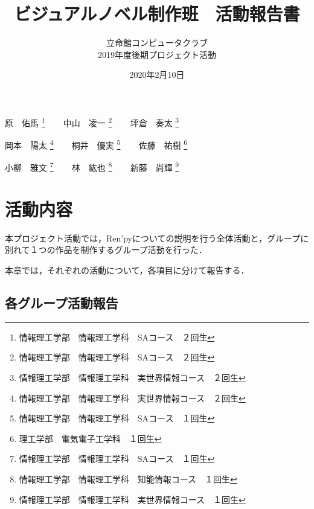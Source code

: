 \documentclass[a4paper]{jarticle}
\title{ビジュアルノベル制作班　活動報告書}
\author{立命館コンピュータクラブ\\2019年度後期プロジェクト活動}
\date{2020年2月10日}
\begin{document}
  \maketitle

  \begin{center}
    原　佑馬 \footnote{情報理工学部　情報理工学科　SAコース　２回生}
    ~~~
    中山　凌一 \footnote{情報理工学部　情報理工学科　SAコース　２回生}
    ~~~
    坪倉　奏太 \footnote{情報理工学部　情報理工学科　実世界情報コース　２回生}
    
    岡本　陽太 \footnote{情報理工学部　情報理工学科　実世界情報コース　２回生}
    ~~~
    桐井　優実 \footnote{情報理工学部　情報理工学科　SAコース　１回生}
    ~~~
    佐藤　祐樹 \footnote{理工学部　電気電子工学科　１回生}
    
    小柳　雅文 \footnote{情報理工学部　情報理工学科　SAコース　１回生}
    ~~~
    林　紘也 \footnote{情報理工学部　情報理工学科　知能情報コース　１回生}
    ~~~
    新藤　尚輝 \footnote{情報理工学部　情報理工学科　実世界情報コース　１回生}

  \end{center}

  \newpage
  \tableofcontents
  \newpage

  
  
  \section{活動内容}

    本プロジェクト活動では，Ren'pyについての説明を行う全体活動と，グループに別れて１つの作品を制作するグループ活動を行った．
      
    本章では，それぞれの活動について，各項目に分けて報告する．

    

    

    

    

    \subsection{各グループ活動報告}

      

      

      

    

    

    
\end{document}

